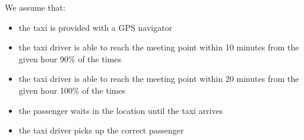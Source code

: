 We assume that:
\begin{itemize}
\item the taxi is provided with a GPS navigator
\item the taxi driver is able to reach the meeting point within 10 minutes from the given hour 90\% of the times
\item the taxi driver is able to reach the meeting point within 20 minutes from the given hour 100\% of the times
\item the passenger waits in the location until the taxi arrives
\item the taxi driver picks up the correct passenger
\end{itemize}
